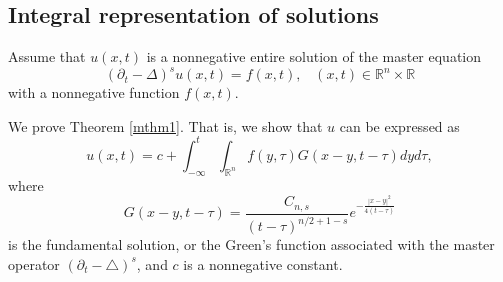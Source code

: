 \documentclass[12pt]{article}
\theoremstyle{remark}
\numberwithin{equation}{section}
\newcommand{\lap}{\mbox{$\triangle$}}
\begin{document}
\subsection{Integral representation of solutions}

Assume that $u(x,t)$ is a nonnegative entire solution of the master equation
\begin{equation} \label{5.1}
(\partial_t - \Delta)^s u(x,t) = f(x,t), \;\;\; (x,t) \in \mathbb{R}^n \times \mathbb{R}
\end{equation}
with a nonnegative function $f(x,t)$.

We prove Theorem \ref{mthm1}. That is, we show that $u$ can be expressed as
\begin{equation} \label{5.0}
u(x,t) = c + \int_{-\infty}^t \int_{\mathbb{R}^n} f(y,\tau) G(x-y, t-\tau) dy d\tau,
\end{equation}
where
$$G(x-y, t-\tau) = \frac{C_{n,s}}{(t-\tau)^{n/2+1-s}} e^{-\frac{|x-y|^2}{4(t-\tau)}}$$
is the fundamental solution, or the Green's function associated with the master operator $(\partial_t - \lap)^s$, and $c$ is a nonnegative constant.
\end{document}
